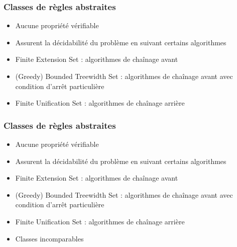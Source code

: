 \begin{frame}[t]
	\frametitle{Classes de règles abstraites}
	\vspace{10mm}
	\begin{itemize}
		\item Aucune propriété vérifiable
		\item Assurent la décidabilité du problème en suivant certains algorithmes
		\item Finite Extension Set : algorithmes de chaînage avant
		\item (Greedy) Bounded Treewidth Set : algorithmes de chaînage avant avec condition
			d'arrêt particulière
		\item Finite Unification Set : algorithmes de chaînage arrière
	\end{itemize}
\end{frame}

\begin{frame}[t]
	\frametitle{Classes de règles abstraites}
	\vspace{10mm}
	\begin{itemize}
		\item Aucune propriété vérifiable
		\item Assurent la décidabilité du problème en suivant certains algorithmes
		\item Finite Extension Set : algorithmes de chaînage avant
		\item (Greedy) Bounded Treewidth Set : algorithmes de chaînage avant avec condition
			d'arrêt particulière
		\item Finite Unification Set : algorithmes de chaînage arrière
		\item Classes incomparables
	\end{itemize}
\end{frame}

